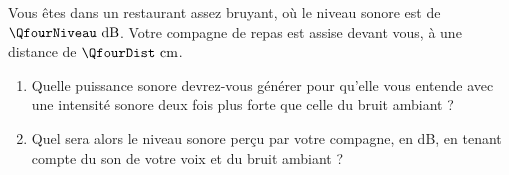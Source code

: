 
Vous êtes dans un restaurant assez bruyant, où le niveau sonore est de $\QfourNiveau\text{ dB}$. Votre compagne de repas est assise devant vous, à une distance de $\QfourDist\text{ cm}$.

\begin{enumerate}[label=\alph*)]
    \item Quelle puissance sonore devrez-vous générer pour qu'elle vous entende avec une intensité sonore deux fois plus forte que celle du bruit ambiant ?
    \item Quel sera alors le niveau sonore perçu par votre compagne, en dB, en tenant compte du son de votre voix et du bruit ambiant ?
\end{enumerate}